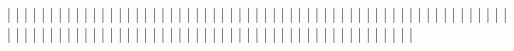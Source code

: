 |                                           |
|                                           |
|                                           |
|                                           |
|                                           |
|                                           |
|                                           |
|                                           |
|                                           |
|                                           |
|                                           |
|                                           |
|                                           |
|                                           |
|                                           |
|                                           |
|                                           |
|                                           |
|                                           |
|                                           |
|                                           |
|                                           |
|                                           |
|                                           |
|                                           |
|                                           |
|                                           |
|                                           |
|                                           |
|                                           |
|                                           |
|                                           |
|                                           |
|                                           |
|                                           |
|                                           |
|                                           |
|                                           |
|                                           |
|                                           |
|                                           |
|                                           |
|                                           |
|                                           |
|                                           |
|                                           |
|                                           |
|                                           |
|                                           |
|                                           |
|                                           |
|                                           |
|                                           |
|
